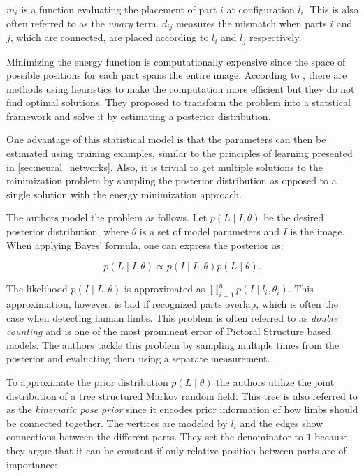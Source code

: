 $m_i$ is a function evaluating the placement of part $i$ at configuration $l_i$.
This is also often referred to as the \textit{unary} term.
$d_{ij}$ measures the mismatch when parts $i$ and $j$, which are connected, are placed according to $l_i$ and $l_j$ respectively.

Minimizing the energy function is computationally expensive since the space of possible positions for each part spans the entire image.
According to \cite{felzenszwalb_pictorial_2005}, there are methods using heuristics to make the computation more efficient but they do not find optimal solutions.
They proposed to transform the problem into a statstical framework and solve it by estimating a posterior distribution.

One advantage of this statistical model is that the parameters can then be estimated using training examples, similar to the principles of learning presented in \ref{sec:neural_networks}.
Also, it is trivial to get multiple solutions to the minimization problem by sampling the posterior distribution as opposed to a single solution with the energy minimization approach.

The authors model the problem as follows.
Let $p(L \mid I, \theta)$ be the desired posterior distribution, where $\theta$ is a set of model parameters and $I$ is the image.
When applying Bayes' formula, one can express the posterior as:

\begin{equation}
    p(L \mid I, \theta) \propto p(I \mid L, \theta) p(L \mid \theta).
\end{equation}

The likelihood $p(I \mid L, \theta)$ is approximated as $\prod_{i=1}^n p(I \mid l_i, \theta_i)$.
This approximation, however, is bad if recognized parts overlap, which is often the case when detecting human limbs.
This problem is often referred to as \textit{double counting} and is one of the most prominent error of Pictoral Structure based models.
The authors tackle this problem by sampling multiple times from the posterior and evaluating them using a separate measurement.

To approximate the prior distribution $p(L \mid \theta)$ the authors utilize the joint distribution of a tree structured Markov random field.
This tree is also referred to as the \textit{kinematic pose prior} since it encodes prior information of how limbs should be connected together.
The vertices are modeled by $l_i$ and the edges show connections between the different parts. 
They set the denominator to $1$ because they argue that it can be constant if only relative position between parts are of importance:


